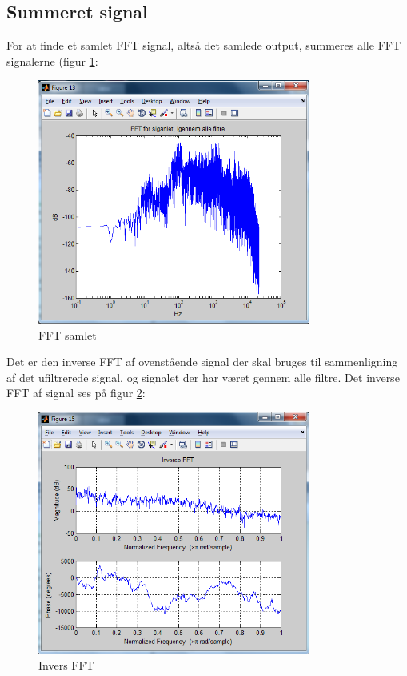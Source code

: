 \subsection{Summeret signal}
For at finde et samlet FFT signal, altså det samlede output, summeres alle FFT signalerne (figur \ref{Figur 11}:

\begin{figure}[h]
	\centering
	\includegraphics[width=0.8\textwidth]{Figurer/8_FFT_signalet_Alle_Filtre}
	\caption{FFT samlet}
	\label{Figur 11}
\end{figure}

Det er den inverse FFT af ovenstående signal der skal bruges til sammenligning af det ufiltrerede signal, og signalet der har været gennem alle filtre. Det inverse FFT af signal ses på figur \ref{Figur 12}:

\begin{figure}[h]
	\centering
	\includegraphics[width=0.8\textwidth]{Figurer/Invers_FFT_Hele_signalet}
	\caption{Invers FFT}
	\label{Figur 12}
\end{figure}

